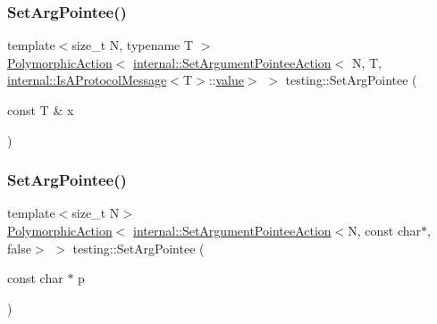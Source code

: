 \mbox{\label{namespacetesting_a5740a5033b88c37666fcd09a269d123f}} 
\subsubsection{\texorpdfstring{SetArgPointee()}{SetArgPointee()}\hspace{0.1cm}{\footnotesize\ttfamily [2/4]}}
{\footnotesize\ttfamily template$<$size\+\_\+t N, typename T $>$ \\
\mbox{\hyperlink{classtesting_1_1_polymorphic_action}{Polymorphic\+Action}}$<$ \mbox{\hyperlink{structtesting_1_1internal_1_1_set_argument_pointee_action}{internal\+::\+Set\+Argument\+Pointee\+Action}}$<$ N, T, \mbox{\hyperlink{structtesting_1_1internal_1_1_is_a_protocol_message}{internal\+::\+Is\+A\+Protocol\+Message}}$<$T$>$\+::\mbox{\hyperlink{_obj__test_2lib_2googletest-master_2googlemock_2test_2gmock-matchers__test_8cc_a337b8a670efc0b086ad3af163f3121b6}{value}}$>$ $>$ testing\+::\+Set\+Arg\+Pointee (\begin{DoxyParamCaption}\item[{const T \&}]{x }\end{DoxyParamCaption})}

\mbox{\label{namespacetesting_a4a190fd2d02fb7cd79c5b3df3f80b647}} 
\subsubsection{\texorpdfstring{SetArgPointee()}{SetArgPointee()}\hspace{0.1cm}{\footnotesize\ttfamily [3/4]}}
{\footnotesize\ttfamily template$<$size\+\_\+t N$>$ \\
\mbox{\hyperlink{classtesting_1_1_polymorphic_action}{Polymorphic\+Action}}$<$ \mbox{\hyperlink{structtesting_1_1internal_1_1_set_argument_pointee_action}{internal\+::\+Set\+Argument\+Pointee\+Action}}$<$N, const char$\ast$, false$>$ $>$ testing\+::\+Set\+Arg\+Pointee (\begin{DoxyParamCaption}\item[{const char $\ast$}]{p }\end{DoxyParamCaption})}

\mbox{\label{namespacetesting_ac128085b4a8d64563fd5ccef324ea177}} 
